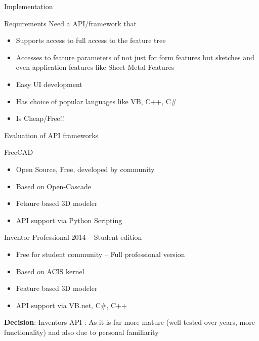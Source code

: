 \begin{frame}{Implementation}
\begin{block}{Requirements}
Need a API/framework that 
\begin{itemize}[noitemsep,label=\textbullet,topsep=2pt,parsep=2pt,partopsep=2pt]
\item Supports access to full access to the feature tree 
\item Accesses to feature parameters of not just for form features but sketches and even application features like Sheet Metal Features
\item Easy UI development
\item Has choice of popular languages like VB, C++, C\# 
\item Is Cheap/Free!!
\end{itemize}
\end{block}
\end{frame}

\begin{frame}{Evaluation of API frameworks}
\begin{block}{FreeCAD}
\begin{itemize}[noitemsep,label=\textbullet,topsep=2pt,parsep=2pt,partopsep=2pt]
\item Open Source, Free, developed by community
\item Based on Open-Cascade
\item Fetaure based 3D modeler
\item API support via Python Scripting
\end{itemize}
\end{block}

\begin{block}{Inventor Professional 2014 – Student edition}
\begin{itemize}[noitemsep,label=\textbullet,topsep=2pt,parsep=2pt,partopsep=2pt]
\item Free for student community – Full professional version
\item Based on ACIS kernel
\item Feature based 3D modeler
\item API support via VB.net, C\#, C++
\end{itemize}
\end{block}

\textbf{Decision}: Inventors API : As it is far more mature (well tested over years, more functionality) and also due to personal familiarity
\end{frame}

